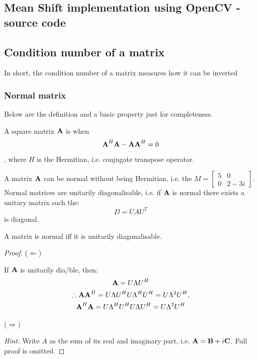 \documentclass[a4paper]{article}
\begin{document}
\newpage
\subsection{Mean Shift implementation using OpenCV - source code}
\label{app:mean_shift_opencv}



\newpage
\subsection{Condition number of a matrix}
\label{app:cond_number}

In short, the condition number of a matrix measures how it can be inverted
\subsubsection{Normal matrix}
Below are the definition and a basic property just for completeness.
\begin{definition}
	A square matrix $\textbf{A}$ is  when
	\begin{equation}
		\textbf{A}^H\textbf{A} - \textbf{A}\textbf{A}^H = 0
	\end{equation}
	, where $H$ is the Hermitian, i.e. conjugate transpose operator.
\end{definition}
A matrix $\textbf{A}$ can be normal without being Hermitian, i.e. the $M = \begin{bmatrix}5 & 0\\0 & 2-3i \end{bmatrix}$. Normal matrices are unitarily diagonalisable, i.e. if $\textbf{A}$ is normal there exists a unitary matrix such the:
\begin{equation*}
	D = U A U^T	
\end{equation*}
is diagonal.
\begin{theorem}
	A matrix is normal iff it is unitarily diagonalisable.
\end{theorem}
\begin{proof}
	($\Leftarrow$)

	If $\textbf{A}$ is unitarily dia/ble, then:
	\begin{gather*}
		\textbf{A} = U \Lambda U^H	\\
		\therefore \textbf{A}\textbf{A}^H = U \Lambda U^H U \Lambda^H U^H = U \Lambda^2 U^H, \\
		\textbf{A}^H \textbf{A} = U \Lambda^H U^H U \Lambda U^H = U \Lambda^2 U^H
	\end{gather*}

	($\Rightarrow$)
	
	\textit{Hint:} Write $A$ as the sum of its real and imaginary part, i.e. $\textbf{A} = \textbf{B} + i\textbf{C}$. Full proof is omitted.
\end{proof}
\end{document}
